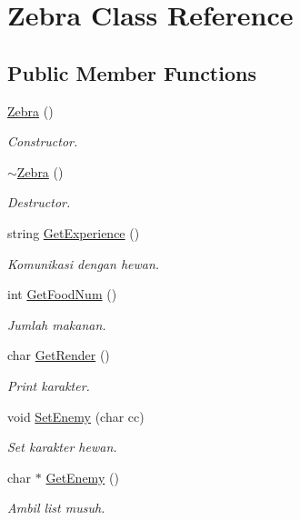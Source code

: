 \hypertarget{class_zebra}{}\section{Zebra Class Reference}
\label{class_zebra}
\subsection*{Public Member Functions}
\begin{DoxyCompactItemize}
\item 
\hyperlink{class_zebra_a06481320d8c665bb5f39e85f83c14ca5}{Zebra} ()\hypertarget{class_zebra_a06481320d8c665bb5f39e85f83c14ca5}{}\label{class_zebra_a06481320d8c665bb5f39e85f83c14ca5}

\begin{DoxyCompactList}\small\item\em Constructor. \end{DoxyCompactList}\item 
\hyperlink{class_zebra_a888564ecb889c3c897267b6619deeb6c}{$\sim$\+Zebra} ()\hypertarget{class_zebra_a888564ecb889c3c897267b6619deeb6c}{}\label{class_zebra_a888564ecb889c3c897267b6619deeb6c}

\begin{DoxyCompactList}\small\item\em Destructor. \end{DoxyCompactList}\item 
string \hyperlink{class_zebra_a6d99c6b3b8e69282eec191982a1922e8}{Get\+Experience} ()\hypertarget{class_zebra_a6d99c6b3b8e69282eec191982a1922e8}{}\label{class_zebra_a6d99c6b3b8e69282eec191982a1922e8}

\begin{DoxyCompactList}\small\item\em Komunikasi dengan hewan. \end{DoxyCompactList}\item 
int \hyperlink{class_zebra_a7ad579e63018f0d666b9d49ddcc01b01}{Get\+Food\+Num} ()
\begin{DoxyCompactList}\small\item\em Jumlah makanan. \end{DoxyCompactList}\item 
char \hyperlink{class_zebra_a264f0cd18f38fc81466d867e08e61806}{Get\+Render} ()
\begin{DoxyCompactList}\small\item\em Print karakter. \end{DoxyCompactList}\item 
void \hyperlink{class_zebra_a110c8832246ce8e762fddff02ffec54e}{Set\+Enemy} (char cc)
\begin{DoxyCompactList}\small\item\em Set karakter hewan. \end{DoxyCompactList}\item 
char $\ast$ \hyperlink{class_zebra_a2e7d4a246b1ed6eb3377f475087c36f0}{Get\+Enemy} ()
\begin{DoxyCompactList}\small\item\em Ambil list musuh. \end{DoxyCompactList}\end{DoxyCompactItemize}
